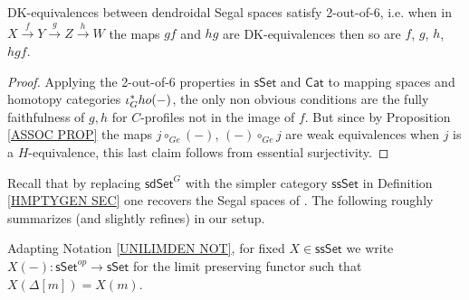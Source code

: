 \documentclass[a4paper,10pt
 ,draft
]{article}%
\begin{document}


\begin{corollary}\label{26COR}
DK-equivalences between dendroidal Segal spaces satisfy 2-out-of-6, i.e. when in
$X \xrightarrow{f} 
Y \xrightarrow{g}
Z \xrightarrow{h} W$ the maps
$gf$ and $hg$ are DK-equivalences then so are
$f$, $g$, $h$, $hgf$.
\end{corollary}

\begin{proof}
Applying the 2-out-of-6 properties in $\mathsf{sSet}$ and $\mathsf{Cat}$ to mapping spaces and homotopy categories $\iota_G^{\**}ho(-)$,
the only non obvious conditions are the fully faithfulness of $g,h$ for $C$-profiles not in the image of $f$. 
But since by Proposition \ref{ASSOC PROP} the maps
$j \circ_{Ge} (-)$, $(-)\circ_{Ge} j$
are weak equivalences when $j$ is a $H$-equivalence,
this last claim follows from essential surjectivity.
\end{proof}

Recall that by replacing $\mathsf{sdSet}^G$
with the simpler category $\mathsf{ssSet}$ in Definition \ref{HMPTYGEN SEC}
one recovers the Segal spaces of \cite{Rez01}.
The following roughly summarizes (and slightly refines)
\cite[Lemma 5.8, Theorem 6.2, Prop. 11.1, Lemma 11.10]{Rez01} in our setup.

Adapting Notation \ref{UNILIMDEN NOT}, for fixed $X \in \mathsf{ssSet}$ we write $X(-)\colon \mathsf{sSet}^{op} \to \mathsf{sSet}$ for the limit preserving functor such that
$X(\Delta[m]) = X(m)$. 
\end{document}

